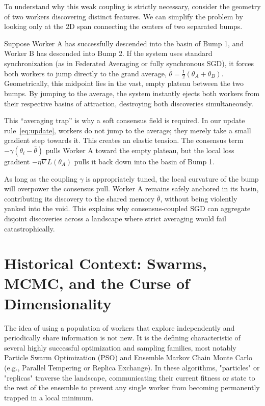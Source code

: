 \documentclass{article}
\begin{document}
To understand why this weak coupling is strictly necessary, consider the geometry of two workers discovering distinct features. We can simplify the problem by looking only at the 2D span connecting the centers of two separated bumps.

Suppose Worker A has successfully descended into the basin of Bump 1, and Worker B has descended into Bump 2. If the system uses standard synchronization (as in Federated Averaging or fully synchronous SGD), it forces both workers to jump directly to the grand average, $\bar{\theta} = \frac{1}{2}(\theta_A + \theta_B)$. Geometrically, this midpoint lies in the vast, empty plateau between the two bumps. By jumping to the average, the system instantly ejects both workers from their respective basins of attraction, destroying both discoveries simultaneously.

This ``averaging trap'' is why a soft consensus field is required. In our update rule~\eqref{eq:update}, workers do not jump to the average; they merely take a small gradient step towards it. This creates an elastic tension. The consensus term $-\gamma(\theta_i - \bar{\theta})$ pulls Worker A toward the empty plateau, but the local loss gradient $-\eta \nabla L(\theta_A)$ pulls it back down into the basin of Bump 1. 

As long as the coupling $\gamma$ is appropriately tuned, the local curvature of the bump will overpower the consensus pull. Worker A remains safely anchored in its basin, contributing its discovery to the shared memory $\bar{\theta}$, without being violently yanked into the void. This explains why consensus-coupled SGD can aggregate disjoint discoveries across a landscape where strict averaging would fail catastrophically.

\section{Historical Context: Swarms, MCMC, and the Curse of Dimensionality}

The idea of using a population of workers that explore independently and periodically share information is not new. It is the defining characteristic of several highly successful optimization and sampling families, most notably Particle Swarm Optimization (PSO) and Ensemble Markov Chain Monte Carlo (e.g., Parallel Tempering or Replica Exchange). In these algorithms, "particles" or "replicas" traverse the landscape, communicating their current fitness or state to the rest of the ensemble to prevent any single worker from becoming permanently trapped in a local minimum.
\end{document}
